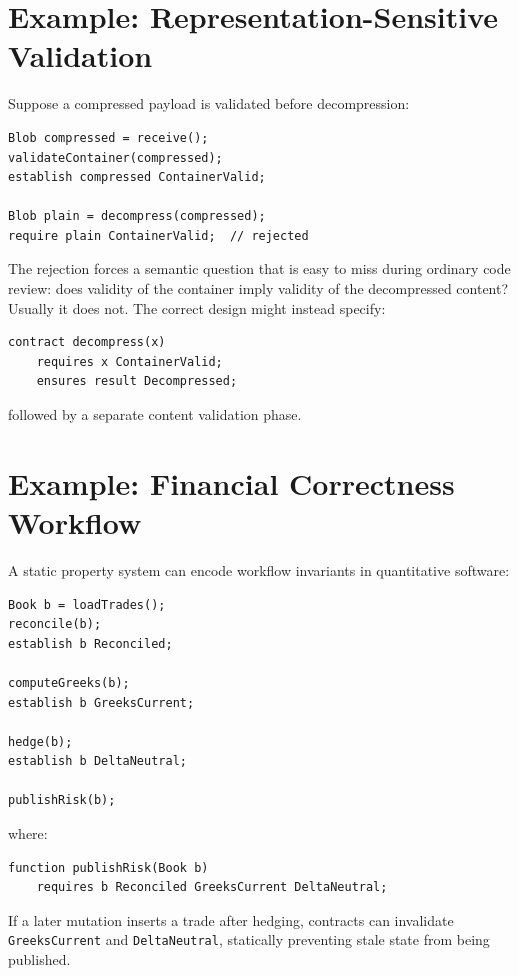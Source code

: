 \documentclass[11pt]{article}
\begin{document}
\section{Example: Representation-Sensitive Validation}
Suppose a compressed payload is validated before decompression:

\begin{lstlisting}
Blob compressed = receive();
validateContainer(compressed);
establish compressed ContainerValid;

Blob plain = decompress(compressed);
require plain ContainerValid;  // rejected
\end{lstlisting}

The rejection forces a semantic question that is easy to miss during ordinary code review: does validity of the container imply validity of the decompressed content? Usually it does not. The correct design might instead specify:

\begin{lstlisting}
contract decompress(x)
    requires x ContainerValid;
    ensures result Decompressed;
\end{lstlisting}

followed by a separate content validation phase.

\section{Example: Financial Correctness Workflow}
A static property system can encode workflow invariants in quantitative software:

\begin{lstlisting}
Book b = loadTrades();
reconcile(b);
establish b Reconciled;

computeGreeks(b);
establish b GreeksCurrent;

hedge(b);
establish b DeltaNeutral;

publishRisk(b);
\end{lstlisting}

where:

\begin{lstlisting}
function publishRisk(Book b)
    requires b Reconciled GreeksCurrent DeltaNeutral;
\end{lstlisting}

If a later mutation inserts a trade after hedging, contracts can invalidate \texttt{GreeksCurrent} and \texttt{DeltaNeutral}, statically preventing stale state from being published.
\end{document}

